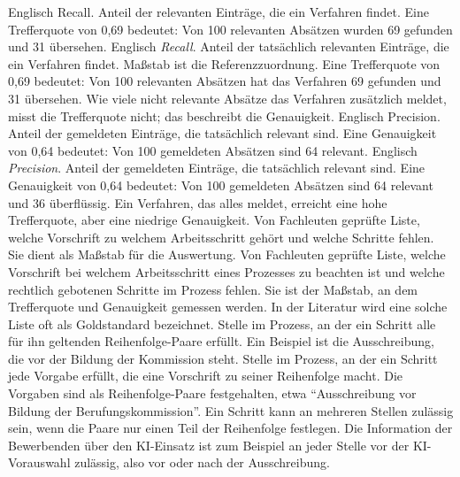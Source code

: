   {Englisch Recall. Anteil der relevanten Einträge, die ein Verfahren findet. Eine Trefferquote von 0,69 bedeutet: Von 100 relevanten Absätzen wurden 69 gefunden und 31 übersehen.}
  {Englisch \emph{Recall}. Anteil der tatsächlich relevanten Einträge, die ein Verfahren findet. Maßstab ist die Referenzzuordnung. Eine Trefferquote von 0,69 bedeutet: Von 100 relevanten Absätzen hat das Verfahren 69 gefunden und 31 übersehen. Wie viele nicht relevante Absätze das Verfahren zusätzlich meldet, misst die Trefferquote nicht; das beschreibt die Genauigkeit.}
  {Englisch Precision. Anteil der gemeldeten Einträge, die tatsächlich relevant sind. Eine Genauigkeit von 0,64 bedeutet: Von 100 gemeldeten Absätzen sind 64 relevant.}
  {Englisch \emph{Precision}. Anteil der gemeldeten Einträge, die tatsächlich relevant sind. Eine Genauigkeit von 0,64 bedeutet: Von 100 gemeldeten Absätzen sind 64 relevant und 36 überflüssig. Ein Verfahren, das alles meldet, erreicht eine hohe Trefferquote, aber eine niedrige Genauigkeit.}
  {Von Fachleuten geprüfte Liste, welche Vorschrift zu welchem Arbeitsschritt gehört und welche Schritte fehlen. Sie dient als Maßstab für die Auswertung.}
  {Von Fachleuten geprüfte Liste, welche Vorschrift bei welchem Arbeitsschritt eines Prozesses zu beachten ist und welche rechtlich gebotenen Schritte im Prozess fehlen. Sie ist der Maßstab, an dem Trefferquote und Genauigkeit gemessen werden. In der Literatur wird eine solche Liste oft als Goldstandard bezeichnet.}
  {Stelle im Prozess, an der ein Schritt alle für ihn geltenden Reihenfolge-Paare erfüllt. Ein Beispiel ist die Ausschreibung, die vor der Bildung der Kommission steht.}
  {Stelle im Prozess, an der ein Schritt jede Vorgabe erfüllt, die eine Vorschrift zu seiner Reihenfolge macht. Die Vorgaben sind als Reihenfolge-Paare festgehalten, etwa \enquote{Ausschreibung vor Bildung der Berufungskommission}. Ein Schritt kann an mehreren Stellen zulässig sein, wenn die Paare nur einen Teil der Reihenfolge festlegen. Die Information der Bewerbenden über den KI-Einsatz ist zum Beispiel an jeder Stelle vor der KI-Vorauswahl zulässig, also vor oder nach der Ausschreibung.}
